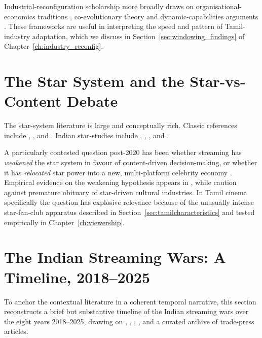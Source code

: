 Industrial-reconfiguration scholarship more broadly draws on
organisational-economics traditions \citep{teece2018,helfat2018},
co-evolutionary theory \citep{murmann2003} and dynamic-capabilities
arguments \citep{teece2018,helfat2018}.  These frameworks are useful
in interpreting the speed and pattern of Tamil-industry adaptation,
which we discuss in Section~\ref{sec:windowing_findings} of
Chapter~\ref{ch:industry_reconfig}.

\section{The Star System and the Star-vs-Content Debate}
\label{sec:starsystem}

The star-system literature is large and conceptually rich.  Classic
references include \citet{dyer1979,dyer1986}, \citet{morin1960},
\citet{deCordova1990} and \citet{mcdonald2013star}.  Indian
star-studies include \citet{prasad2014},
\citet{majumdar2009starsindia}, \citet{rajadhyaksha2009},
\citet{nakassis2017} and \citet{punathambekar2013}.

A particularly contested question post-2020 has been whether
streaming has \emph{weakened} the star system in favour of
content-driven decision-making, or whether it has \emph{relocated}
star power into a new, multi-platform celebrity economy
\citep{cunningham2019,sundet2021,lotz2022}.  Empirical evidence on
the weakening hypothesis appears in
\citet{schauerte2021,garcia2023streaming}, while
\citet{lotz2022,nakassis2017} caution against premature obituary of
star-driven cultural industries.  In Tamil cinema specifically the
question has explosive relevance because of the unusually intense
star-fan-club apparatus described in
Section~\ref{sec:tamilcharacteristics} and tested empirically in
Chapter~\ref{ch:viewership}.

\section{The Indian Streaming Wars: A Timeline, 2018--2025}
\label{sec:streaming_wars}

To anchor the contextual literature in a coherent temporal narrative,
this section reconstructs a brief but substantive timeline of the
Indian streaming wars over the eight years 2018--2025, drawing on
\citet{ficciey2018,ficciey2019,ficciey2020,ficciey2021,ficciey2022,
ficciey2023,ficciey2024}, \citet{kpmg2019,kpmg2021,kpmg2022,kpmg2023},
\citet{bcg2018india,bcg2022}, \citet{statista2019,statista2023,
statista2024}, \citet{economist2022jiocinema,economictimes2024jiomerger,
economist2022netflix} and a curated archive of trade-press articles.

